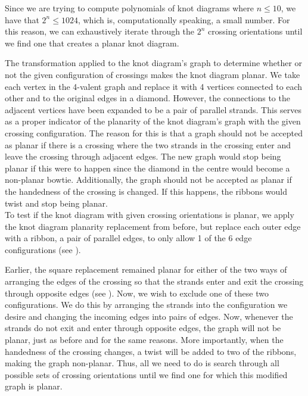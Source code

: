 \begin{paper}
Since we are trying to compute polynomials of knot diagrams where $n\leq10$,
we have that $2^n\leq1024$, which is, computationally speaking, a small number.
For this reason, we can exhaustively iterate through the $2^n$ crossing
orientations until we find one that creates a planar knot diagram.

{The transformation applied to the knot diagram's graph to determine whether or
not the given configuration of crossings makes the knot diagram planar.
We take each vertex in the 4-valent graph and replace it with 4 vertices
connected to each other and to the original edges in a diamond.
However, the connections to the adjacent vertices have been expanded to be a
pair of parallel strands.
This serves as a proper indicator of the planarity of the knot diagram's graph
with the given crossing configuration.
The reason for this is that a graph should not be accepted as planar if there is
a crossing where the two strands in the crossing enter and leave the crossing
through adjacent edges.
The new graph would stop being planar if this were to happen since the diamond
in the centre would become a non-planar bowtie.
Additionally, the graph should not be accepted as planar if the handedness of
the crossing is changed.
If this happens, the ribbons would twist and stop being planar.}\\

To test if the knot diagram with given crossing orientations is planar, we
apply the knot diagram planarity replacement from before, but replace each outer
edge with a ribbon, a pair of parallel edges, to only allow 1 of the 6 edge
configurations (see \figRibbon).

Earlier, the square replacement remained planar for either of the two ways of
arranging the edges of the crossing so that the strands enter and exit the
crossing through opposite edges (see \figGraph).
Now, we wish to exclude one of these two configurations.
We do this by arranging the strands into the configuration we desire and
changing the incoming edges into pairs of edges.
Now, whenever the strands do not exit and enter through opposite edges, the
graph will not be planar, just as before and for the same reasons.
More importantly, when the handedness of the crossing changes, a twist will be
added to two of the ribbons, making the graph non-planar.
Thus, all we need to do is search through all possible sets of crossing
orientations until we find one for which this modified graph is planar.


\end{paper}

